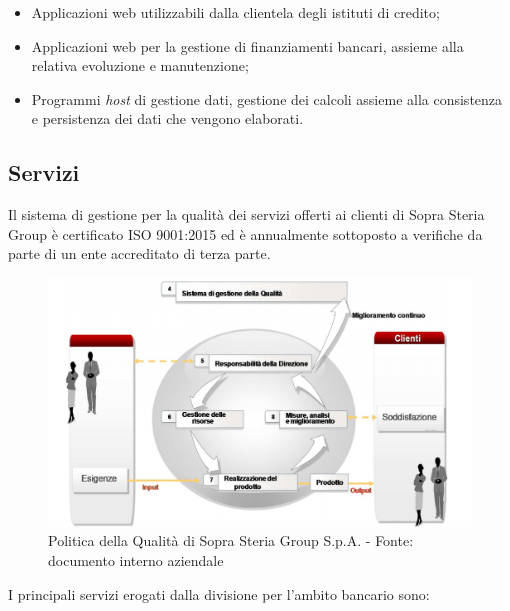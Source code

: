 	\begin{itemize}
		\item Applicazioni web utilizzabili dalla clientela degli istituti di credito;
		\item Applicazioni web per la gestione di finanziamenti bancari, assieme alla relativa evoluzione e manutenzione;
		\item Programmi \textit{host} di gestione dati, gestione dei calcoli assieme alla consistenza e persistenza dei dati che vengono elaborati.
	\end{itemize}
	
	\subsection{Servizi}
	
	Il sistema di gestione per la qualità dei servizi offerti ai clienti di Sopra Steria Group è certificato ISO 9001:2015 ed è annualmente sottoposto a verifiche da parte di un ente accreditato di terza parte.\\

	\begin{figure}[H]
	\centering
   	\includegraphics[width=1\textwidth]{immagini/ISO9001}
   	\caption{Politica della Qualità di Sopra Steria Group S.p.A. - Fonte: documento interno aziendale}
	\end{figure}
	
	
	I principali servizi erogati dalla divisione per l'ambito bancario sono:
	
